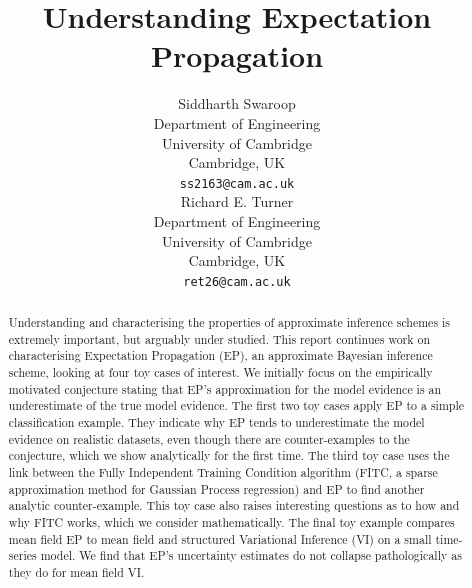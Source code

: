 \documentclass{article}
\title{Understanding Expectation Propagation}
\author{
  Siddharth Swaroop\\
  Department of Engineering\\
  University of Cambridge\\
  Cambridge, UK \\
  \texttt{ss2163@cam.ac.uk} \\
  \And
  Richard E. Turner \\
  Department of Engineering \\
  University of Cambridge\\
  Cambridge, UK\\
  \texttt{ret26@cam.ac.uk} \\
}
\begin{document}
\maketitle
%
\begin{abstract}
%
Understanding and characterising the properties of approximate inference schemes is extremely important, but arguably under studied. This report continues work on characterising Expectation Propagation (EP), an approximate Bayesian inference scheme, looking at four toy cases of interest. We initially focus on the empirically motivated conjecture stating that EP's approximation for the model evidence is an underestimate of the true model evidence. The first two toy cases apply EP to a simple classification example. They indicate why EP tends to underestimate the model evidence on realistic datasets, even though there are counter-examples to the conjecture, which we show analytically for the first time. The third toy case uses the link between the Fully Independent Training Condition algorithm (FITC, a sparse approximation method for Gaussian Process regression) and EP to find another analytic counter-example. This toy case also raises interesting questions as to how and why FITC works, which we consider mathematically. The final toy example compares mean field EP to mean field and structured Variational Inference (VI) on a small time-series model. We find that EP's uncertainty estimates do not collapse pathologically as they do for mean field VI.
%
\end{abstract}
%
\end{document}
